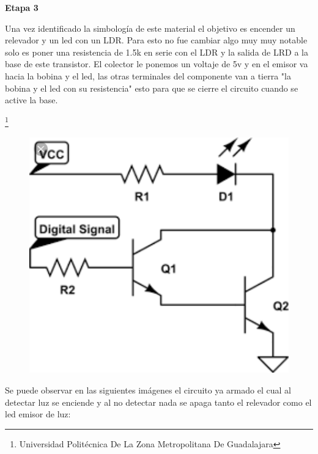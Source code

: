 \documentclass[11pt,a4paper]{article}
\begin{document}
\textbf{Etapa 3
}

Una vez identificado la simbología de este material el objetivo es encender un relevador y un led con un LDR. Para esto no fue cambiar algo muy muy notable solo es poner una resistencia de 1.5k en serie con el LDR y la salida de LRD a la base de este transistor. El colector le ponemos un voltaje de 5v y en el emisor va hacia la bobina y el led, las otras terminales del componente van a tierra "la bobina y el led con su resistencia" esto para que se cierre el circuito cuando se active la base.

\footnote{Universidad Politécnica De La Zona Metropolitana De Guadalajara} 

\newpage

\begin{figure}[hbtp]
\centering
\includegraphics[scale=0.30]{5.png}
\end{figure}

Se puede observar en las siguientes imágenes el circuito ya armado el cual al detectar luz se enciende y al no detectar nada se apaga tanto el relevador como el led emisor de luz:
\end{document}
